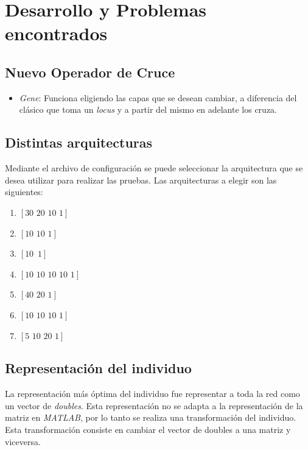 \documentclass{sig-alternate}
\begin{document}
\section{Desarrollo y Problemas encontrados}

	\subsection{Nuevo Operador de Cruce}

	\begin{itemize}
		\item \textit{Gene}: Funciona eligiendo las capas que se desean cambiar, a diferencia del clásico que toma un \textit{locus} y a partir del mismo en adelante los cruza.
	\end{itemize}


	\subsection{Distintas arquitecturas}

	Mediante el archivo de configuración se puede seleccionar la arquitectura que se desea utilizar para realizar las pruebas. Las arquitecturas a elegir son las siguientes:

	\begin{center}
		\begin{enumerate}
			\item $[30\,\,20\,\,10\,\,1]$
			\item $[10\,\,10\,\,1]$
			\item $[10\,\,\,1]$
			\item $[10\,\,10\,\,10\,\,10\,\,1]$
			\item $[40\,\,20\,\,1]$
			\item $[10\,\,10\,\,10\,\,1]$
			\item $[5\,\,10\,\,20\,\,1]$
		\end{enumerate}
	\end{center}

	\subsection{Representación del individuo}

	La representación más óptima del individuo fue representar a toda la red como un vector de \textit{doubles}. Esta representación no se adapta a la representación de la matriz en \textit{MATLAB}, por lo tanto se realiza una transformación del individuo. Esta transformación consiste en cambiar el vector de doubles a una matriz y viceversa.
\end{document}
